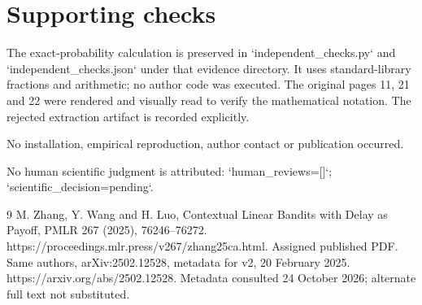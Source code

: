 \documentclass[10pt]{article}
\begin{document}
\section*{Supporting checks}
The exact-probability calculation is preserved in `independent\_checks.py` and `independent\_checks.json` under that evidence directory. It uses standard-library fractions and arithmetic; no author code was executed. The original pages 11, 21 and 22 were rendered and visually read to verify the mathematical notation. The rejected extraction artifact is recorded explicitly.\par
No installation, empirical reproduction, author contact or publication occurred.\par
No human scientific judgment is attributed: `human\_reviews=[]`; `scientific\_decision=pending`.\par
9 M. Zhang, Y. Wang and H. Luo, Contextual Linear Bandits with Delay as Payoff, PMLR 267 (2025), 76246–76272. https://proceedings.mlr.press/v267/zhang25ca.html. Assigned published PDF. Same authors, arXiv:2502.12528, metadata for v2, 20 February 2025. https://arxiv.org/abs/2502.12528. Metadata consulted 24 October 2026; alternate full text not substituted.\par
\end{document}
